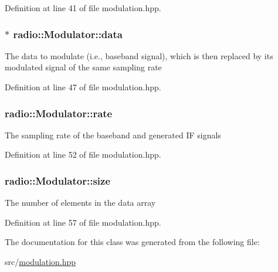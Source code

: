 Definition at line 41 of file modulation.\+hpp.

\hypertarget{classradio_1_1Modulator_a39d698f7720aa3677ecaf1baf83c8fa0}{
\subsubsection[{data}]{$\ast$ radio\+::\+Modulator\+::data\hspace{0.3cm}{\ttfamily [protected]}}}\label{classradio_1_1Modulator_a39d698f7720aa3677ecaf1baf83c8fa0}
The data to modulate (i.\+e., baseband signal), which is then replaced by its modulated signal of the same sampling rate 

Definition at line 47 of file modulation.\+hpp.

\hypertarget{classradio_1_1Modulator_a8901a2170e850a767dd40f9494dd7536}{
\subsubsection[{rate}]{ radio\+::\+Modulator\+::rate\hspace{0.3cm}{\ttfamily [protected]}}}\label{classradio_1_1Modulator_a8901a2170e850a767dd40f9494dd7536}
The sampling rate of the baseband and generated I\+F signals 

Definition at line 52 of file modulation.\+hpp.

\hypertarget{classradio_1_1Modulator_ad1fbba4bdd6a8c8d2ff05cb7be60fc5c}{
\subsubsection[{size}]{ radio\+::\+Modulator\+::size\hspace{0.3cm}{\ttfamily [protected]}}}\label{classradio_1_1Modulator_ad1fbba4bdd6a8c8d2ff05cb7be60fc5c}
The number of elements in the data array 

Definition at line 57 of file modulation.\+hpp.



The documentation for this class was generated from the following file\+:\begin{DoxyCompactItemize}
\item 
src/\hyperlink{modulation_8hpp}{modulation.\+hpp}\end{DoxyCompactItemize}
